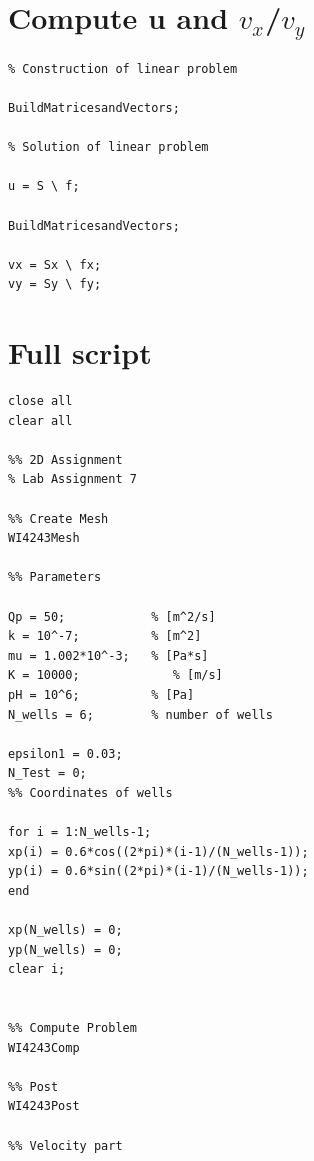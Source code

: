 \documentclass[a4paper]{report}
\begin{document}
\begin{appendices}
\begin{lstlisting}
\end{lstlisting}

\section{Compute u and $v_x$/$v_y$}


\begin{lstlisting}
% Construction of linear problem

BuildMatricesandVectors;

% Solution of linear problem

u = S \ f;

BuildMatricesandVectors;

vx = Sx \ fx;
vy = Sy \ fy;
\end{lstlisting}

\section{Full script}
\begin{lstlisting}
close all
clear all

%% 2D Assignment
% Lab Assignment 7

%% Create Mesh
WI4243Mesh

%% Parameters

Qp = 50;            % [m^2/s]
k = 10^-7;          % [m^2]
mu = 1.002*10^-3;   % [Pa*s]
K = 10000;             % [m/s]
pH = 10^6;          % [Pa]
N_wells = 6;        % number of wells

epsilon1 = 0.03;
N_Test = 0;
%% Coordinates of wells

for i = 1:N_wells-1;
xp(i) = 0.6*cos((2*pi)*(i-1)/(N_wells-1));
yp(i) = 0.6*sin((2*pi)*(i-1)/(N_wells-1));
end

xp(N_wells) = 0;
yp(N_wells) = 0;
clear i;


%% Compute Problem
WI4243Comp

%% Post
WI4243Post

%% Velocity part


\end{lstlisting}

\end{appendices}
\end{document}

